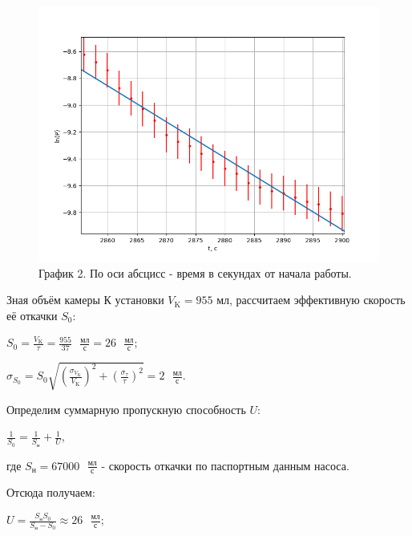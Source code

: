 \documentclass[a4paper,12pt]{article} %
\begin{document}
\begin{enumerate}
	\begin{center}
	\end{center}

\newpage
\begin{figure}[h!]
	\centering
	\includegraphics[scale=0.8]{Pictures/lnP(t) ТМН.png}
	\caption*{График 2. По оси абсцисс - время в секундах от начала работы.}
\end{figure}


Зная объём камеры К установки $V_{\text{K}} = 955$ мл, рассчитаем эффективную скорость её откачки $S_{0}$:

$S_{0} = \frac{V_{\text{K}}}{\tau} = \frac{955}{37}\text{ }\frac{\text{мл}}{\text{с}} = 26\text{ }\frac{\text{мл}}{\text{с}}$;

$\sigma_{S_{0}} = S_{0}\sqrt{\left(\frac{\sigma_{V_{\text{K}}}}{V_{\text{K}}}\right)^2 + \left(\frac{\sigma_{\tau}}{\tau}\right)^2} = 2\text{ }\frac{\text{мл}}{\text{с}}$.

\begin{center}
\end{center}


Определим суммарную пропускную способность $U$:


$\frac{1}{S_{0}} = \frac{1}{S_{\text{н}}} + \frac{1}{U}$,

где $S_{\text{н}} = 67000\text{ }\frac{\text{мл}}{\text{с}}$ - скорость откачки по паспортным данным насоса.

Отсюда получаем:

$U = \frac{S_{\text{н}}S_{0}}{S_{\text{н}} - S_{0}} \approx 26\text{ }\frac{\text{мл}}{\text{с}}$;


\end{enumerate}
\end{document}
